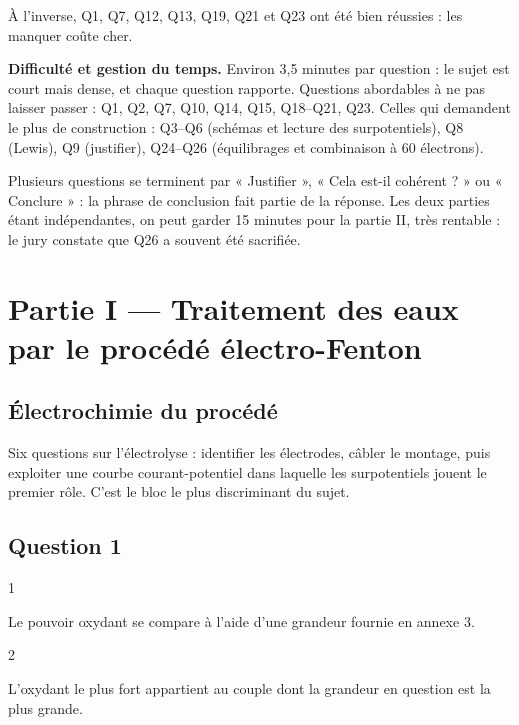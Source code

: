 \documentclass[11pt,a4paper]{article}
\begin{document}
À l'inverse, Q1, Q7, Q12, Q13, Q19, Q21 et Q23 ont été bien réussies : les manquer coûte cher.

\textbf{Difficulté et gestion du temps.} Environ 3,5 minutes par question : le sujet est court mais dense, et chaque question rapporte. Questions abordables à ne pas laisser passer : Q1, Q2, Q7, Q10, Q14, Q15, Q18--Q21, Q23. Celles qui demandent le plus de construction : Q3--Q6 (schémas et lecture des surpotentiels), Q8 (Lewis), Q9 (justifier), Q24--Q26 (équilibrages et combinaison à 60 électrons).

Plusieurs questions se terminent par « Justifier », « Cela est-il cohérent ? » ou « Conclure » : la phrase de conclusion fait partie de la réponse. Les deux parties étant indépendantes, on peut garder 15 minutes pour la partie II, très rentable : le jury constate que Q26 a souvent été sacrifiée.

\hypertarget{partie-i-traitement-des-eaux-par-le-procuxe9duxe9-uxe9lectro-fenton}{%
\section{Partie I --- Traitement des eaux par le procédé électro-Fenton}\label{partie-i-traitement-des-eaux-par-le-procuxe9duxe9-uxe9lectro-fenton}}

\hypertarget{uxe9lectrochimie-du-procuxe9duxe9}{%
\subsection{Électrochimie du procédé}\label{uxe9lectrochimie-du-procuxe9duxe9}}

Six questions sur l'électrolyse : identifier les électrodes, câbler le montage, puis exploiter une courbe courant-potentiel dans laquelle les surpotentiels jouent le premier rôle. C'est le bloc le plus discriminant du sujet.

\hypertarget{question-1}{%
\subsection{Question 1}\label{question-1}}

\begin{indication}{1}

Le pouvoir oxydant se compare à l'aide d'une grandeur fournie en annexe 3.

\end{indication}

\begin{indication}{2}

L'oxydant le plus fort appartient au couple dont la grandeur en question est la plus grande.

\end{indication}
\end{document}
